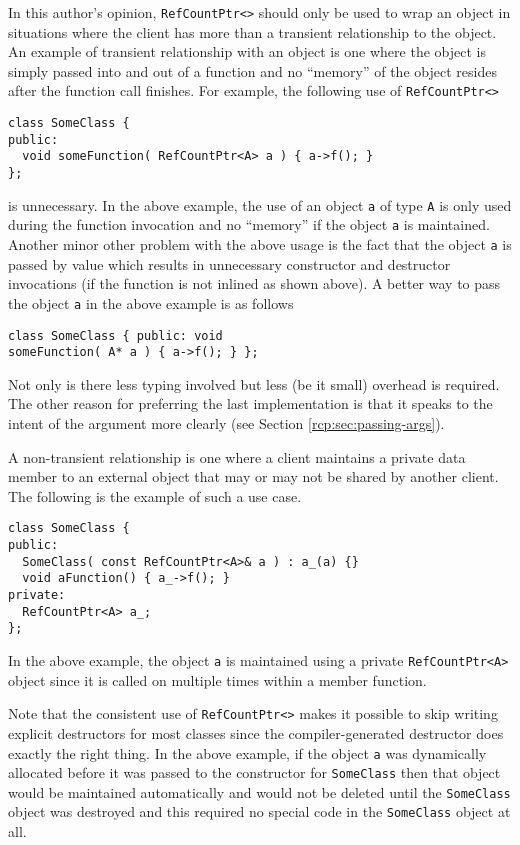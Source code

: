 In this author's opinion, {}\texttt{RefCountPtr<>} should only be used
to wrap an object in situations where the client has more than a
transient relationship to the object.  An example of transient
relationship with an object is one where the object is simply passed
into and out of a function and no ``memory'' of the object resides
after the function call finishes.  For example, the following use
of {}\texttt{RefCountPtr<>}

{\scriptsize\begin{verbatim}
class SomeClass {
public:
  void someFunction( RefCountPtr<A> a ) { a->f(); }
};
\end{verbatim}}

{}\noindent{}is unnecessary.  In the above example, the use of an
object {}\texttt{a} of type {}\texttt{A} is only used during the
function invocation and no ``memory'' if the object {}\texttt{a} is
maintained.  Another minor other problem with the above usage is the
fact that the object {}\texttt{a} is passed by value which results in
unnecessary constructor and destructor invocations (if the function is
not inlined as shown above).  A better way to pass the object
{}\texttt{a} in the above example is as follows

{\scriptsize\begin{verbatim}
class SomeClass { public: void
someFunction( A* a ) { a->f(); } };
\end{verbatim}}

{}\noindent{}Not only is there less typing involved but less (be it
small) overhead is required.  The other reason for preferring the last
implementation is that it speaks to the intent of the argument more
clearly (see Section {}\ref{rcp:sec:passing-args}).

A non-transient relationship is one where a client maintains a private
data member to an external object that may or may not be shared by
another client.  The following is the example of such a use case.

{\scriptsize\begin{verbatim}
class SomeClass {
public:
  SomeClass( const RefCountPtr<A>& a ) : a_(a) {}
  void aFunction() { a_->f(); }
private:
  RefCountPtr<A> a_;
};
\end{verbatim}}

{}\noindent{} In the above example, the object {}\texttt{a} is
maintained using a private {}\texttt{RefCountPtr<A>} object since it
is called on multiple times within a member function.

Note that the consistent use of {}\texttt{RefCountPtr<>} makes it
possible to skip writing explicit destructors for most classes since
the compiler-generated destructor does exactly the right thing.  In
the above example, if the object {}\texttt{a} was dynamically
allocated before it was passed to the constructor for
{}\texttt{SomeClass} then that object would be maintained
automatically and would not be deleted until the {}\texttt{SomeClass}
object was destroyed and this required no special code in the
{}\texttt{SomeClass} object at all.

